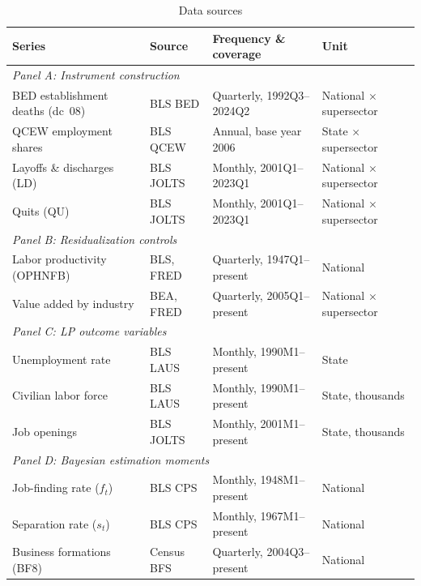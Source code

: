 \documentclass[authoryear, review, 12pt]{elsarticle}
\begin{document}
	\begin{table}[H]
	\centering\footnotesize
	\caption{Data sources\label{tab:data_sources}}
	\begin{tabular}{@{}p{3.8cm}p{2.4cm}p{4.2cm}p{3.2cm}@{}}
		\toprule
		Series & Source & Frequency \& coverage & Unit \\
		\midrule
		\multicolumn{4}{l}{\textit{Panel A: Instrument construction}} \\[2pt]
		BED establishment deaths (dc~08) & BLS BED   & Quarterly, 1992Q3--2024Q2  & National $\times$ supersector \\[2pt]
		QCEW employment shares           & BLS QCEW  & Annual, base year 2006     & State $\times$ supersector    \\[2pt]
		Layoffs \& discharges (LD)        & BLS JOLTS & Monthly, 2001Q1--2023Q1    & National $\times$ supersector \\[2pt]
		Quits (QU)                       & BLS JOLTS & Monthly, 2001Q1--2023Q1    & National $\times$ supersector \\[5pt]
		\multicolumn{4}{l}{\textit{Panel B: Residualization controls}} \\[2pt]
		Labor productivity (OPHNFB)      & BLS, FRED & Quarterly, 1947Q1--present & National                      \\[2pt]
		Value added by industry          & BEA, FRED & Quarterly, 2005Q1--present & National $\times$ supersector \\[5pt]
		\multicolumn{4}{l}{\textit{Panel C: LP outcome variables}} \\[2pt]
		Unemployment rate                & BLS LAUS  & Monthly, 1990M1--present   & State                         \\[2pt]
		Civilian labor force             & BLS LAUS  & Monthly, 1990M1--present   & State, thousands              \\[2pt]
		Job openings                     & BLS JOLTS & Monthly, 2001M1--present   & State, thousands              \\[5pt]
		\multicolumn{4}{l}{\textit{Panel D: Bayesian estimation moments}} \\[2pt]
		Job-finding rate ($f_t$)         & BLS CPS   & Monthly, 1948M1--present   & National                      \\[2pt]
		Separation rate ($s_t$)          & BLS CPS   & Monthly, 1967M1--present   & National                      \\[2pt]
		Business formations (BF8)        & Census BFS & Quarterly, 2004Q3--present & National                     \\[2pt]
		\bottomrule
	\end{tabular}
	\end{table}
\end{document}

